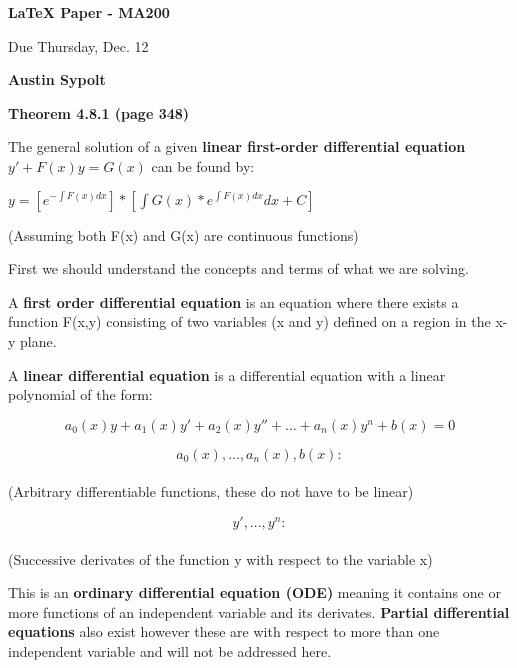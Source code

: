 \documentclass[12pt]{article}
\begin{document}
\begin{center}
{\textbf{LaTeX Paper - MA200}}

Due Thursday, Dec. 12

       


{\textbf{Austin Sypolt}}
\end{center}

\vspace{9pt}

 {\bf Theorem 4.8.1 (page 348)}

\bigskip

The general solution of a given {\bf linear first-order differential equation}\\ $y' + F(x)y = G(x)$ can be found by:
\bigskip

$y = [ e^{-\int F(x) dx} ] * [ \int G(x) * e^{\int F(x) dx } dx + C] $

\bigskip

(Assuming both F(x) and G(x) are continuous functions)


\bigskip
\bigskip

First we should understand the concepts and terms of what we are solving.

\bigskip
\bigskip

A {\bf first order differential equation} is an equation where there exists a function F(x,y) consisting of two variables (x and y) defined on a region in the x-y plane.

\bigskip
\bigskip

A {\bf linear differential equation} is a differential equation with a linear polynomial of the form:


\[a_0 (x)y + a_1 (x)y' + a_2 (x)y'' + ... + a_n (x)y^n + b(x) = 0 \]

\bigskip
\bigskip

 \[a_0 (x), ... , a_n (x), b(x) : \] \\(Arbitrary differentiable functions, these do not have to be linear)

\bigskip

\[y', ... , y^n : \] \\ (Successive derivates of the function y with respect to the variable x)

\bigskip
\bigskip

This is an {\bf ordinary differential equation (ODE)} meaning it contains one or more functions of an independent variable and its derivates. {\bf Partial differential equations} also exist however these are with respect to more than one independent variable and will not be addressed here.
\end{document}
